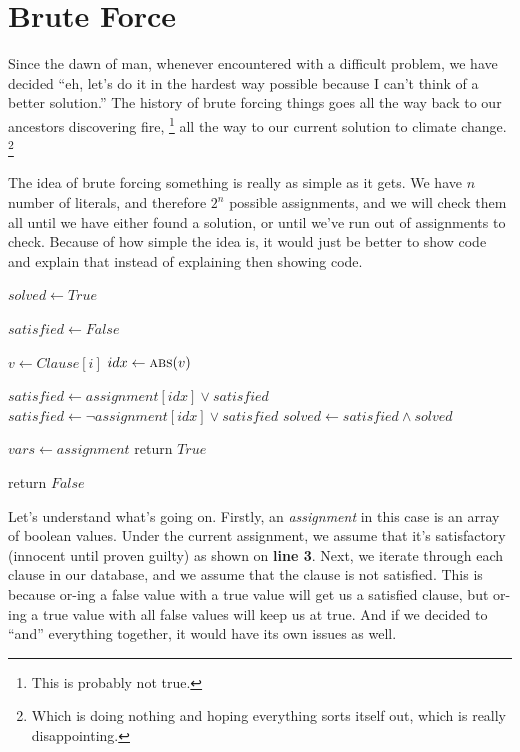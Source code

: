 \chapter{Brute Force}

Since the dawn of man, whenever encountered with a difficult problem, we have
decided ``eh, let's do it in the hardest way possible because I can't think of a
better solution.'' The history of brute forcing things goes all the way back to
our ancestors discovering fire,
\footnote{This is probably not true.} 
all the way to our current solution to climate change.
\footnote{Which is doing nothing and hoping
everything sorts itself out, which is really disappointing.}

The idea of brute forcing something is really as simple as it gets. We have $n$
number of literals, and therefore $2^n$ possible assignments, and we will check
them all until we have either found a solution, or until we've run out of
assignments to check. Because of how simple the idea is, it would just be
better to show code and explain that instead of explaining then showing code.

\begin{algorithm}[H]
\caption{Brute Force}\label{alg:3}
\begin{algorithmic}[1]

    \State $solved \gets True$

        \State $satisfied \gets False$

            \State $v \gets Clause[i]$
            \State $idx \gets \Call{abs}{v}$

                \State $satisfied \gets assignment[idx] \vee satisfied$
            \Else 
                \State $satisfied \gets \neg assignment[idx] \vee satisfied$
            \EndIf
        \EndFor
        \State $solved \gets satisfied \wedge solved$
    \EndFor

        \State $vars \gets assignment$
        \State return $True$
    \EndIf
\EndFor

\State return $False$

\EndProcedure
\end{algorithmic}
\end{algorithm}

Let's understand what's going on. Firstly, an \textit{assignment} in this case 
is an array of boolean values. Under the current assignment, we assume that it's
satisfactory (innocent until proven guilty) as shown on \textbf{line 3}. Next, 
we iterate through each clause in our database, and we assume that the clause is 
not satisfied. This is because or-ing a false value with a true value will get us 
a satisfied clause, but or-ing a true value with all false values will keep us 
at true. And if we decided to ``and'' everything together, it would have its own 
issues as well. 

